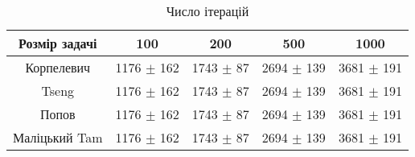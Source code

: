 \begin{table}[H]
	\centering
	\begin{tabular}{|c||c|c|c|c|}\hline
		Розмір задачі & 100 & 200 & 500 & 1000 \\ \hline \hline
		Корпелевич & 1176 $\pm$ 162 & 1743 $\pm$ 87 & 2694 $\pm$ 139 & 3681 $\pm$ 191 \\ \hline
		Tseng & 1176 $\pm$ 162 & 1743 $\pm$ 87 & 2694 $\pm$ 139 & 3681 $\pm$ 191 \\ \hline
		Попов & 1176 $\pm$ 162 & 1743 $\pm$ 87 & 2694 $\pm$ 139 & 3681 $\pm$ 191 \\ \hline
		Маліцький Tam & 1176 $\pm$ 162 & 1743 $\pm$ 87 & 2694 $\pm$ 139 & 3681 $\pm$ 191 \\ \hline
	\end{tabular}
	\caption{Число ітерацій}
\end{table}
